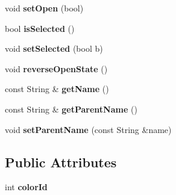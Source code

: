 \begin{DoxyCompactItemize}
\item 
\hypertarget{classProcessorListItem_a0316c822a9900c1b905d1aa7cdcac959}{void {\bfseries set\-Open} (bool)}\label{classProcessorListItem_a0316c822a9900c1b905d1aa7cdcac959}

\item 
\hypertarget{classProcessorListItem_a73019958aff6397cf7d84e5bd7296ebd}{bool {\bfseries is\-Selected} ()}\label{classProcessorListItem_a73019958aff6397cf7d84e5bd7296ebd}

\item 
\hypertarget{classProcessorListItem_a52859c6b7cafd0506839dfa4d21a9753}{void {\bfseries set\-Selected} (bool b)}\label{classProcessorListItem_a52859c6b7cafd0506839dfa4d21a9753}

\item 
\hypertarget{classProcessorListItem_a237afc4c1c5d76e9747b99dbe731352e}{void {\bfseries reverse\-Open\-State} ()}\label{classProcessorListItem_a237afc4c1c5d76e9747b99dbe731352e}

\item 
\hypertarget{classProcessorListItem_af7ab7fd5ad3b16069ed44100a9a1436f}{const String \& {\bfseries get\-Name} ()}\label{classProcessorListItem_af7ab7fd5ad3b16069ed44100a9a1436f}

\item 
\hypertarget{classProcessorListItem_a643aa9eba406af23ce41c31b784b8290}{const String \& {\bfseries get\-Parent\-Name} ()}\label{classProcessorListItem_a643aa9eba406af23ce41c31b784b8290}

\item 
\hypertarget{classProcessorListItem_a802e11ca96c271c24f52924e6433d405}{void {\bfseries set\-Parent\-Name} (const String \&name)}\label{classProcessorListItem_a802e11ca96c271c24f52924e6433d405}

\end{DoxyCompactItemize}
\subsection*{Public Attributes}
\begin{DoxyCompactItemize}
\item 
\hypertarget{classProcessorListItem_adb7ccd81ccfc66575555f2f5f0ccc460}{int {\bfseries color\-Id}}\label{classProcessorListItem_adb7ccd81ccfc66575555f2f5f0ccc460}

\end{DoxyCompactItemize}
